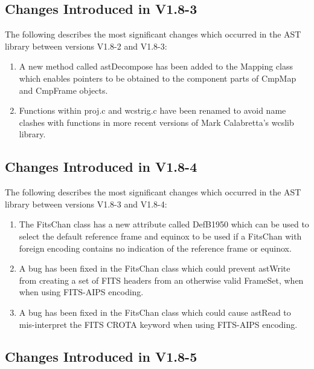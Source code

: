 \documentclass[twoside,11pt]{article}
\begin{document}
\subsection{Changes Introduced in V1.8-3}

The following describes the most significant changes which
occurred in the AST library between versions V1.8-2 and V1.8-3:

\begin{enumerate}

\item A new method called astDecompose has been added to the Mapping class
which enables pointers to be obtained to the component parts of CmpMap and
CmpFrame objects.

\item Functions within proj.c and wcstrig.c have been renamed to avoid name
clashes with functions in more recent versions of Mark Calabretta's wcslib
library.

\end{enumerate}

\subsection{Changes Introduced in V1.8-4}

The following describes the most significant changes which
occurred in the AST library between versions V1.8-3 and V1.8-4:

\begin{enumerate}

\item The FitsChan class has a new attribute called DefB1950 which can be
used to select the default reference frame and equinox to be used if
a FitsChan with foreign encoding contains no indication of the
reference frame or equinox.

\item A bug has been fixed in the FitsChan class which could prevent
astWrite from creating a set of FITS headers from an otherwise valid
FrameSet, when when using FITS-AIPS encoding.

\item A bug has been fixed in the FitsChan class which could cause
astRead to mis-interpret the FITS CROTA keyword when using FITS-AIPS
encoding.

\end{enumerate}

\subsection{Changes Introduced in V1.8-5}
\end{document}
